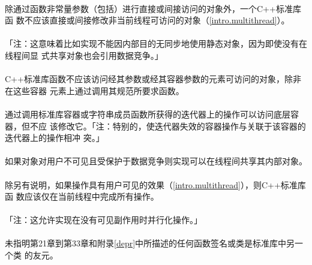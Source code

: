 \paragraph{}
除通过函数非常量参数（包括）进行直接或间接访问的对象外，一个C++标准库函
数不应该直接或间接修改非当前线程可访问的对象（\ref{intro.multithread}）。

\paragraph{}
「注：这意味着比如实现不能因内部目的无同步地使用静态对象，因为即使没有在线程间显
式共享对象也会引用数据竞争。」

\paragraph{}
C++标准库函数不应该访问经其参数或经其容器参数的元素可访问的对象，除非在这些容器
元素上通过调用其规范所要求函数。

\paragraph{}
通过调用标准库容器或字符串成员函数所获得的迭代器上的操作可以访问底层容器，但不应
该修改它。「注：特别的，使迭代器失效的容器操作与关联于该容器的迭代器上的操作相冲
突。」

\paragraph{}
如果对象对用户不可见且受保护于数据竞争则实现可以在线程间共享其内部对象。

\paragraph{}
除另有说明，如果操作具有用户可见的效果（\ref{intro.multithread}），则C++标准库函
数应该仅在当前线程中完成所有操作。

\paragraph{}
「注：这允许实现在没有可见副作用时并行化操作。」

\paragraph{}
未指明第21章到第33章和附录\ref{depr}中所描述的任何函数签名或类是标准库中另一个类
的友元。


